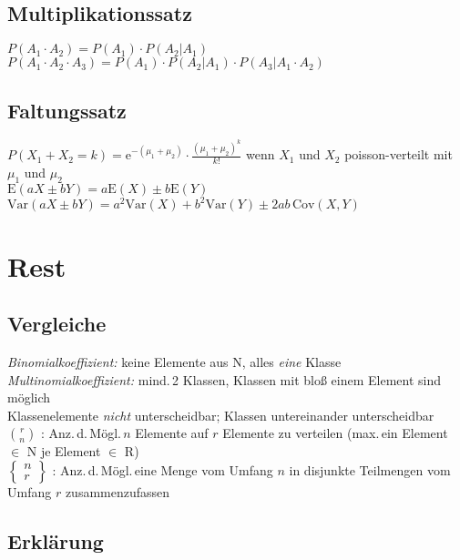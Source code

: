 \documentclass[a4paper,10pt,titlepage]{scrartcl}
\begin{document}
\subsection*{Multiplikationssatz}
\label{sec:multiplikationssatz}
$P(A_1\cdot A_2)=P(A_1)\cdot P(A_2|A_1)$ \qquad $P(A_1\cdot A_2\cdot A_3)=P(A_1)\cdot P(A_2|A_1)\cdot P(A_3|A_1\cdot A_2)$

\subsection*{Faltungssatz}
\label{sec:faltungssatz}
$P(X_1+X_2=k)=\mathrm{e}^{-(\mu_1+\mu_2)}\cdot\frac{(\mu_1+\mu_2)^k}{k!}$ \quad wenn $X_1$ und $X_2$ poisson-verteilt mit $\mu_1$ und $\mu_2$\\
$\mathrm{E}(aX\pm bY)=a\mathrm{E}(X)\pm b\mathrm{E}(Y)$\\
$\mathrm{Var}(aX\pm bY)=a^2\mathrm{Var}(X)+b^2\mathrm{Var}(Y)\pm 2ab\,\mathrm{Cov}(X,Y)$

\section*{Rest}
\label{sec:rest}
\subsection*{Vergleiche}
\label{sec:vergleiche}
\emph{Binomialkoeffizient:} keine Elemente aus N, alles \emph{eine} Klasse\\
\emph{Multinomialkoeffizient:} mind.\,2 Klassen, Klassen mit bloß einem Element sind möglich\medskip\\
Klassenelemente \emph{nicht} unterscheidbar; Klassen untereinander unterscheidbar
\bigskip\\
$\binom{r}{n}$ : Anz.\,d.\,Mögl.\,$n$ Elemente auf $r$ Elemente zu verteilen (max.\,ein Element $\in$ N je Element $\in$ R)\\
$\begin{Bmatrix}n\\r\end{Bmatrix}$ : Anz.\,d.\,Mögl.\,eine Menge vom Umfang $n$ in disjunkte Teilmengen vom Umfang $r$ zusammenzufassen\\

\subsection*{Erklärung}
\label{sec:erklaerung}
\end{document}
